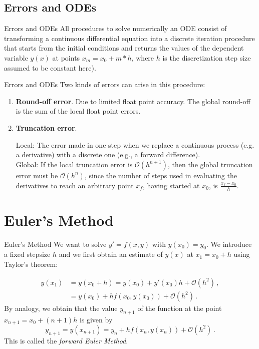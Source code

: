 \documentclass[11pt]{beamer}
\begin{document}
\subsection{Errors and ODEs}
\begin{frame}[fragile]{Errors and ODEs}
All procedures to solve numerically an ODE consist of transforming
a continuous differential equation into a discrete iteration procedure
that starts from the initial conditions and returns the values of the
dependent variable $y(x)$ at points $x_m = x_0 + m * h$, where $h$
is the discretization step size  assumed to be constant here).
\end{frame}

\begin{frame}[fragile]{Errors and ODEs}
Two kinds of errors can arise in this procedure:
\begin{enumerate}
\item \textbf{Round-off error}. Due to limited float point accuracy. The global round-off
  is the sum of the local float point errors.

\item {\bf Truncation error}. 

  Local: The error made in one step when we replace a continuous process
  (e.g. a derivative) with a discrete one (e.g., a forward difference).\\

  Global: If the local truncation error is $\mathcal{O}(h^{n+1})$, then the
  global truncation error must be $\mathcal{O}(h^n)$, since the number of steps
  used in evaluating the derivatives to reach an arbitrary point
  $x_f$, having started at $x_0$, is $\frac{x_f - x_0}{h}$.

\end{enumerate}
\end{frame}

\section{Euler's Method}
\begin{frame}[fragile]{Euler's Method}
We want to solve $y' = f(x,y)$ with $y(x_0) = y_0$. We introduce
a fixed stepsize $h$ and we first obtain an estimate of $y(x)$ at
$x_1 = x_0 + h$ using Taylor's theorem:

\begin{equation}
\begin{aligned}
y(x_1) &= y(x_0+h) = y(x_0) + y'(x_0) h + \mathcal{O}(h^2)\,,\\
       &= y(x_0) + h f(x_0,y(x_0)) +  \mathcal{O}(h^2)\,.
\end{aligned}
\end{equation}
By analogy, we obtain that the value $y_{n+1}$ of the function at the
point $x_{n+1} = x_0 + (n+1) h$ is given by
\begin{equation}
y_{n+1} = y(x_{n+1}) = y_n + h f(x_n,y(x_n)) + \mathcal{O}(h^2)\,.
\end{equation}
This is called the \emph{forward Euler Method}.
\end{frame}
\end{document}
